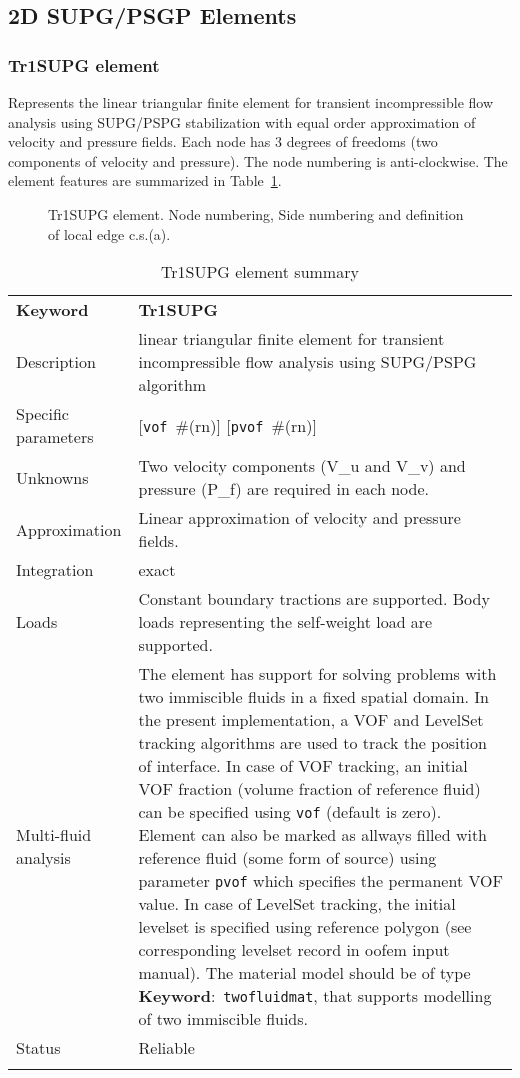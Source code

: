 \documentclass[a4paper]{article}
\newcommand{\descitem}[1]{{\noindent \textbf{#1}}:}
\newcommand{\elemkeyword}[1]{\descitem{Keyword}~\param{#1}} %
\newcommand{\param}[1]{\texttt{#1}} %
\newcommand{\optional}[1]{[#1]} %
\newcommand{\field}[2]{\param{#1}~\#{\tiny(#2)}} %
\newcommand{\optField}[2]{\optional{\field{#1}{#2}}}
\newcommand{\templabel}{}%
\newcommand{\tempcaption}{}%
\newcounter{nelpar}
\newenvironment{elementsummary}[5]{%
  \gdef\tempcaption{#4}%
  \gdef\templabel{#5}%
  \setcounter{nelpar}{0}%
  \begin{center} %
    \begin{table}[!htb] %
      \begin{tabular}{|l|p{9cm}|}\hline %
        {\bf Keyword} & \bf{#1}\\ %
        {Description} & {#2}\\ %
        {Specific parameters} & {#3}\\ \hline %
}{
  \\ \hline %
      \end{tabular}%
      \caption{\tempcaption}%
      \label{\templabel}%
    \end{table}%
  \end{center}%
}
\newcommand{\elementDescription}[2]{{#1} & {#2}\\ }
\begin{document}
\clearpage
\subsection{2D SUPG/PSGP Elements}
\subsubsection{Tr1SUPG element}
\label{Tr1SUPG}
Represents the linear triangular finite element for transient
incompressible flow analysis using SUPG/PSPG stabilization with equal order
approximation of velocity and pressure fields. Each node has 3 degrees
of freedoms (two components of velocity and pressure).
The node numbering is anti-clockwise. The element features are summarized in Table~\ref{Tr1SUPGsummary}.

\begin{figure}[htb]
 \centering
 \begin{makeimage}
  
 \end{makeimage}
 \caption{Tr1SUPG element. Node numbering, Side numbering and
 definition of local edge c.s.(a).}
 \label{Tr1SUPG2fig}
\end{figure}

\begin{elementsummary}{Tr1SUPG}{linear triangular finite element for transient
incompressible flow analysis using SUPG/PSPG algorithm}{\optField{vof}{rn} \optField{pvof}{rn}}{Tr1SUPG element summary}{Tr1SUPGsummary}
\elementDescription{Unknowns}{Two velocity components (V\_u and V\_v) and pressure (P\_f) are required in each node.}
\elementDescription{Approximation}{Linear approximation of velocity and pressure fields.}
\elementDescription{Integration}{exact}
\elementDescription{Loads}{Constant boundary tractions are supported. Body loads
representing the self-weight load are supported.}
\elementDescription{Multi-fluid analysis}{The element has support for solving
problems with two immiscible fluids in
a fixed spatial domain. In the present implementation, a VOF and LevelSet tracking algorithms
are used to track the position of interface. In case of VOF tracking, an initial VOF fraction
(volume fraction of reference fluid) can be specified using
\param{vof} (default is zero). Element can also be marked as allways
filled with reference fluid (some form of source) using parameter
\param{pvof} which specifies the permanent VOF value. In case of LevelSet tracking, the initial levelset is specified using 
reference polygon (see corresponding levelset record in oofem input manual).
The material model should be of type \elemkeyword{twofluidmat}, that
supports modelling of two immiscible fluids.}
\elementDescription{Status}{Reliable}
\end{elementsummary}
\end{document}
